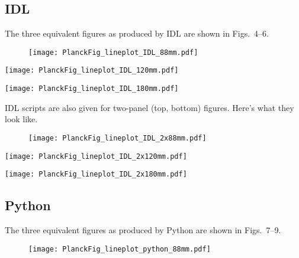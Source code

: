 \documentclass[traditabstract]{aa}
\begin{document}
\clearpage






\subsection{IDL}

The three equivalent figures as produced by IDL are shown in Figs.~4--6.

\begin{figure}[h]
\texttt{[image: PlanckFig\_lineplot\_IDL\_88mm.pdf]}
\caption{\fcaption} 
\end{figure}

\begin{figure*}
\sidecaption
\texttt{[image: PlanckFig\_lineplot\_IDL\_120mm.pdf]}
\caption{\fcaption}
\end{figure*}

\begin{figure*}
\texttt{[image: PlanckFig\_lineplot\_IDL\_180mm.pdf]}
\caption{\fcaption}
\end{figure*}

\clearpage

IDL scripts are also given for two-panel (top, bottom) figures.  Here's what they look like.


\begin{figure}[h]
\texttt{[image: PlanckFig\_lineplot\_IDL\_2x88mm.pdf]}
\caption{\fcaption} 
\end{figure}

\begin{figure*}
\sidecaption
\texttt{[image: PlanckFig\_lineplot\_IDL\_2x120mm.pdf]}
\caption{\fcaption}
\end{figure*}

\begin{figure*}
\texttt{[image: PlanckFig\_lineplot\_IDL\_2x180mm.pdf]}
\caption{\fcaption}
\end{figure*}

\clearpage





\subsection{Python}

The three equivalent figures as produced by Python are shown in Figs.~7--9.


\begin{figure}[h]
\texttt{[image: PlanckFig\_lineplot\_python\_88mm.pdf]}
\caption{\fcaption} 
\end{figure}
\end{document}
